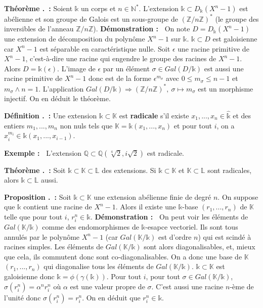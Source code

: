 \documentclass[5pt,a4paper]{article}
\newcounter{prop}[section]
\newcounter{defin}[section]
\newcounter{thm}[section]
\renewcommand{\theprop}{\thesection.\arabic{prop}}
\renewcommand{\thedefin}{\thesection.\arabic{defin}}
\renewcommand{\thethm}{\thesection.\arabic{thm}}
\newcommand{\prop}[1]{\stepcounter{prop}\noindent\textbf{Proposition \theprop ~:} #1 \newline}
\newcommand{\defin}[1]{\stepcounter{defin}\noindent\textbf{Définition \thedefin ~:} #1 \newline}
\newcommand{\thm}[1]{\stepcounter{thm}\noindent\textbf{Théorème \thethm ~:} #1 \newline}
\newcommand{\demo}[1]{\textbf{Démonstration :~} #1 \newline}
\newcommand{\ex}[1]{\textbf{Exemple :~} #1 \newline}
\begin{document}
\begin{onehalfspacing}
\thm{Soient $\mathds{k}$ un corps et $n \in \mathbb{N}^*$. L'extension $\mathds{k} \subset D_\mathds{k}(X^n - 1)$ est abélienne et son groupe de Galois est un sous-groupe de $(\mathbb{Z}/n\mathbb{Z})^*$ (le groupe des inversibles de l'anneau $\mathbb{Z}/n\mathbb{Z}$).}
\demo{On note $D = D_\mathds{k}(X^n - 1)$ une extension de décomposition du polynôme $X^n - 1$ sur $\mathds{k}$. $\mathds{k} \subset D$ est galoisienne car $X^n - 1$ est séparable en caractéristique nulle. Soit $\epsilon$ une racine primitive de $X^n - 1$, c'est-à-dire une racine qui engendre le groupe des racines de $X^n - 1$. Alors $D = \mathds{k}(\epsilon)$. L'image de $\epsilon$ par un élément $\sigma \in Gal(D/\mathds{k})$ est aussi une racine primitive de $X^n - 1$ donc est de la forme $\epsilon^{m_{\sigma}}$ avec $0 \leq m _{\sigma} \leq n-1$ et $m_\sigma \wedge n=1$. L'application $Gal(D/\mathds{k}) \Rightarrow (\mathbb{Z}/n\mathbb{Z})^*,~\sigma \mapsto m_{\sigma}$ est un morphisme injectif. On en déduit le théorème.}


\defin{Une extension $\mathds{k} \subset \mathbb{K}$ est \textbf{radicale} s'il existe $x_1, ..., x_n \in \hat{\mathds{k}}$ et des entiers $m_1, ..., m_n$ non nuls tels que $\mathbb{K} = \mathds{k}(x_1, ..., x_n)$ et pour tout $i$, on a $x_i^{m_i} \in \mathds{k}(x_1, ..., x_{i-1})$.}


\ex{L'extension $\mathbb{Q} \subset \mathbb{Q}(\sqrt[4]{2}, i\sqrt{2})$ est radicale.}


\thm{Soit $\mathds{k} \subset \mathbb{K} \subset \mathbb{L}$ des extensions. Si $\mathds{k} \subset \mathbb{K}$ et $\mathbb{K} \subset \mathbb{L}$ sont radicales, alors $\mathds{k} \subset \mathbb{L}$ aussi.}


\prop{Soit $\mathds{k} \subset \mathbb{K}$ une extension abélienne finie de degré $n$. On suppose que $\mathds{k}$ contient une racine de $X^n - 1$. Alors il existe une $\mathds{k}$-base $(r_1, ..., r_n)$ de $\mathbb{K}$ telle que pour tout $i$, $r_i^n \in \mathds{k}$.}
\demo{On peut voir les éléments de $Gal(\mathbb{K}/\mathds{k})$ comme des endomorphismes de $\mathds{k}$-esapce vectoriel. Ils sont tous annulés par le polynôme $X^n - 1$ (car $Gal(\mathbb{K}/\mathds{k})$ est d'ordre $n$) qui est scindé à racines simples. Les éléments de $Gal(\mathbb{K}/\mathds{k})$ sont alors diagonalisables, et, mieux que cela, ils commutent donc sont co-diagonalisables. On a donc une base de $\mathbb{K}$ $(r_1, ..., r_n)$ qui diagonalise tous les éléments de $Gal(\mathbb{K}/\mathds{k})$. $\mathds{k} \subset \mathbb{K}$ est galoisienne donc $\mathds{k} = \phi(\gamma(\mathds{k}))$. Pour tout $i$, pour tout $\sigma \in Gal(\mathbb{K}/\mathds{k})$, $\sigma(r_i^n) = \alpha^nr_i^n$ où $\alpha$ est une valeur propre de $\sigma$. C'est aussi une racine $n$-ème de l'unité donc $\sigma(r_i^n) = r_i^n$. On en déduit que $r_i^n \in \mathds{k}$.}



\end{onehalfspacing}
\end{document}
